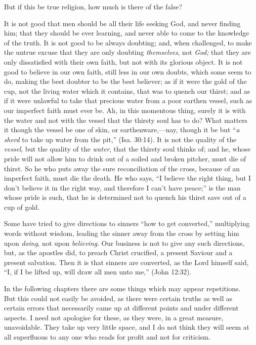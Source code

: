 \documentclass[
]{book}
\begin{document}
But if this be true religion, how much is there of the false?

It is not good that men should be all their life seeking God, and never finding him; that they should be ever learning, and never able to come to the knowledge of the truth. It is not good to be always doubting; and, when challenged, to make the untrue excuse that they are only doubting \emph{themselves}, not \emph{God;} that they are only dissatisfied with their own faith, but not with its glorious object. It is not good to believe in our own faith, still less in our own doubts, which some seem to do, making the best doubter to be the best believer; as if it were the gold of the cup, not the living water which it contains, that was to quench our thirst; and as if it were unlawful to take that precious water from a poor earthen vessel, such as our imperfect faith must ever be. Ah, in this momentous thing, surely it is with the water and not with the vessel that the thirsty soul has to do? What matters it though the vessel be one of skin, or earthenware,---nay, though it be but ``\emph{a sherd} to take up water from the pit,'' (Isa. 30:14). It is not the quality of the \emph{vessel}, but the quality of the \emph{water}, that the thirsty soul thinks of; and he, whose pride will not allow him to drink out of a soiled and broken pitcher, must die of thirst. So he who puts away the sure reconciliation of the cross, because of an imperfect faith, must die the death. He who says, ``I believe the right thing, but I don't believe it in the right way, and therefore I can't have peace;'' is the man whose pride is such, that he is determined not to quench his thirst save out of a cup of gold.

Some have tried to give directions to sinners ``how to get converted,'' multiplying words without wisdom, leading the sinner away from the cross by setting him upon \emph{doing}, not upon \emph{believing}. Our business is not to give any such directions, but, as the apostles did, to preach Christ crucified, a present Saviour and a present salvation. Then it is that sinners are converted, as the Lord himself said, ``I, if I be lifted up, will draw all men unto me,'' (John 12:32).

In the following chapters there are some things which may appear repetitions. But this could not easily be avoided, as there were certain truths as well as certain errors that necessarily came up at different points and under different aspects. I need not apologise for these, as they were, in a great measure, unavoidable. They take up very little space, and I do not think they will seem at all superfluous to any one who reads for profit and not for criticism.
\end{document}
